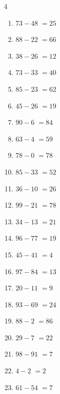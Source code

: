 \begin{multicols}{4}
\begin{enumerate}
  \item $73-48$
        $=25$

  \item $88-22$
        $=66$

  \item $38-26$
        $=12$

  \item $73-33$
        $=40$

  \item $85-23$
        $=62$

  \item $45-26$
        $=19$

  \item $90-6$
        $=84$

  \item $63-4$
        $=59$

  \item $78-0$
        $=78$

  \item $85-33$
        $=52$

  \item $36-10$
        $=26$

  \item $99-21$
        $=78$

  \item $34-13$
        $=21$

  \item $96-77$
        $=19$

  \item $45-41$
        $=4$

  \item $97-84$
        $=13$

  \item $20-11$
        $=9$

  \item $93-69$
        $=24$

  \item $88-2$
        $=86$

  \item $29-7$
        $=22$

  \item $98-91$
        $=7$

  \item $4-2$
        $=2$

  \item $61-54$
        $=7$

\columnbreak %


\end{enumerate}
\end{multicols}
